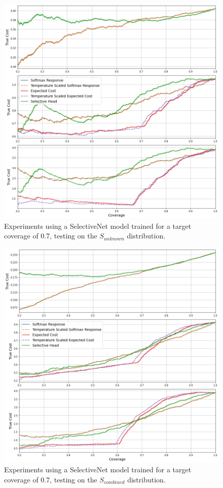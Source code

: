 \begin{figure}[H]
	\includegraphics[width=\textwidth]{images/binary/sn0.7_out_distribution.png}
	\caption*{Experiments using a SelectiveNet model trained for a target coverage of 0.7, testing on the $S_{unknown}$ distribution.}
\end{figure}

\begin{figure}[H]
	\includegraphics[width=\textwidth]{images/binary/sn0.7_combine_distribution.png}
	\caption*{Experiments using a SelectiveNet model trained for a target coverage of 0.7, testing on the $S_{combined}$ distribution.}
\end{figure}

